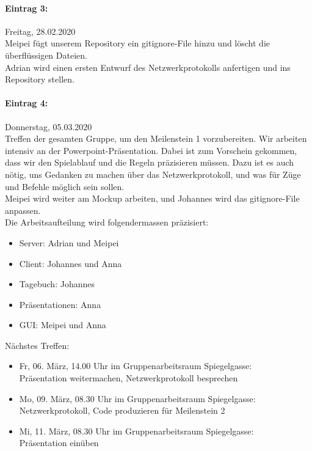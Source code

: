 \documentclass[12pt]{article}
\begin{document}
\paragraph{Eintrag 3:}
Freitag, 28.02.2020\\
Meipei f\"ugt unserem Repository ein gitignore-File hinzu und l\"oscht die überflüssigen Dateien.\\
Adrian wird einen ersten Entwurf des Netzwerkprotokolls anfertigen und ins Repository stellen.

\paragraph{Eintrag 4:}
Donnerstag, 05.03.2020\\
Treffen der gesamten Gruppe, um den Meilenstein 1 vorzubereiten. Wir arbeiten intensiv an der Powerpoint-Pr\"asentation. Dabei ist zum Vorschein gekommen, dass wir den Spielablauf und die Regeln pr\"azisieren m\"ussen. Dazu ist es auch n\"otig, uns Gedanken zu machen \"uber das Netzwerkprotokoll, und was f\"ur Z\"uge und Befehle m\"oglich sein sollen.\\
Meipei wird weiter am Mockup arbeiten, und Johannes wird das gitignore-File anpassen.\\
Die Arbeitsaufteilung wird folgendermassen pr\"azisiert:
\begin{itemize}
\item Server: Adrian und Meipei
\item Client: Johannes und Anna
\item Tagebuch: Johannes
\item Pr\"asentationen: Anna
\item GUI: Meipei und Anna\\
\end{itemize}

\noindent N\"achstes Treffen:
\begin{itemize}
\item Fr, 06. M\"arz, 14.00 Uhr im Gruppenarbeitsraum Spiegelgasse:\\
Pr\"asentation weitermachen, Netzwerkprotokoll besprechen
\item Mo, 09. M\"arz, 08.30 Uhr im Gruppenarbeitsraum Spiegelgasse:\\
Netzwerkprotokoll, Code produzieren f\"ur Meilenstein 2
\item Mi, 11. M\"arz, 08.30 Uhr im Gruppenarbeitsraum Spiegelgasse:\\
Pr\"asentation ein\"uben
\end{itemize}
\end{document}
